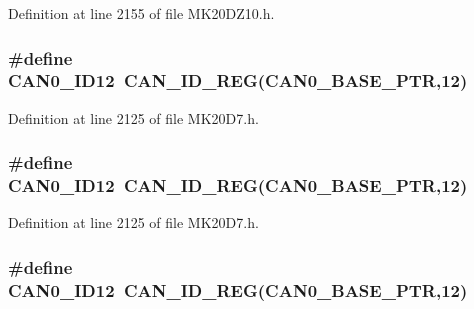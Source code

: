 Definition at line 2155 of file M\+K20\+D\+Z10.\+h.

\subsubsection[{\texorpdfstring{C\+A\+N0\+\_\+\+I\+D12}{CAN0_ID12}}]{\setlength{\rightskip}{0pt plus 5cm}\#define C\+A\+N0\+\_\+\+I\+D12~{\bf C\+A\+N\+\_\+\+I\+D\+\_\+\+R\+EG}({\bf C\+A\+N0\+\_\+\+B\+A\+S\+E\+\_\+\+P\+TR},12)}\hypertarget{group___c_a_n___register___accessor___macros_ga89bd5432f4868dade997dd31992f7fe8}{}\label{group___c_a_n___register___accessor___macros_ga89bd5432f4868dade997dd31992f7fe8}


Definition at line 2125 of file M\+K20\+D7.\+h.

\subsubsection[{\texorpdfstring{C\+A\+N0\+\_\+\+I\+D12}{CAN0_ID12}}]{\setlength{\rightskip}{0pt plus 5cm}\#define C\+A\+N0\+\_\+\+I\+D12~{\bf C\+A\+N\+\_\+\+I\+D\+\_\+\+R\+EG}({\bf C\+A\+N0\+\_\+\+B\+A\+S\+E\+\_\+\+P\+TR},12)}\hypertarget{group___c_a_n___register___accessor___macros_ga89bd5432f4868dade997dd31992f7fe8}{}\label{group___c_a_n___register___accessor___macros_ga89bd5432f4868dade997dd31992f7fe8}


Definition at line 2125 of file M\+K20\+D7.\+h.

\subsubsection[{\texorpdfstring{C\+A\+N0\+\_\+\+I\+D12}{CAN0_ID12}}]{\setlength{\rightskip}{0pt plus 5cm}\#define C\+A\+N0\+\_\+\+I\+D12~{\bf C\+A\+N\+\_\+\+I\+D\+\_\+\+R\+EG}({\bf C\+A\+N0\+\_\+\+B\+A\+S\+E\+\_\+\+P\+TR},12)}\hypertarget{group___c_a_n___register___accessor___macros_ga89bd5432f4868dade997dd31992f7fe8}{}\label{group___c_a_n___register___accessor___macros_ga89bd5432f4868dade997dd31992f7fe8}


